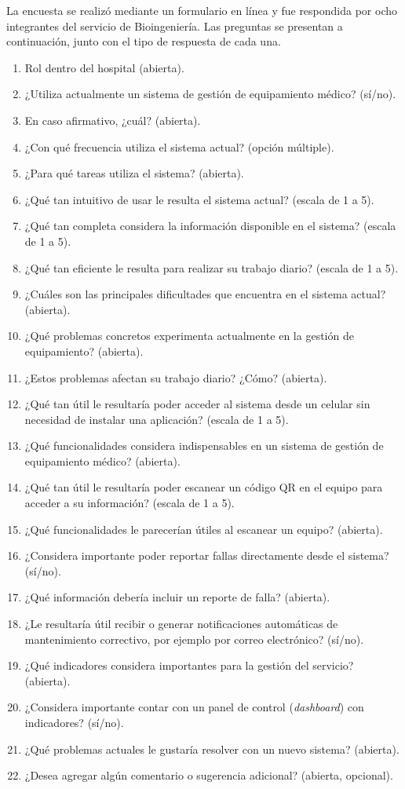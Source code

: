 \documentclass[10pt]{article}
\begin{document}
La encuesta se realizó mediante un formulario en línea y fue respondida por ocho integrantes del servicio de Bioingeniería. Las preguntas se presentan a continuación, junto con el tipo de respuesta de cada una.

{\small
\begin{enumerate}
    \item Rol dentro del hospital (abierta).
    \item ¿Utiliza actualmente un sistema de gestión de equipamiento médico? (sí/no).
    \item En caso afirmativo, ¿cuál? (abierta).
    \item ¿Con qué frecuencia utiliza el sistema actual? (opción múltiple).
    \item ¿Para qué tareas utiliza el sistema? (abierta).
    \item ¿Qué tan intuitivo de usar le resulta el sistema actual? (escala de 1 a 5).
    \item ¿Qué tan completa considera la información disponible en el sistema? (escala de 1 a 5).
    \item ¿Qué tan eficiente le resulta para realizar su trabajo diario? (escala de 1 a 5).
    \item ¿Cuáles son las principales dificultades que encuentra en el sistema actual? (abierta).
    \item ¿Qué problemas concretos experimenta actualmente en la gestión de equipamiento? (abierta).
    \item ¿Estos problemas afectan su trabajo diario? ¿Cómo? (abierta).
    \item ¿Qué tan útil le resultaría poder acceder al sistema desde un celular sin necesidad de instalar una aplicación? (escala de 1 a 5).
    \item ¿Qué funcionalidades considera indispensables en un sistema de gestión de equipamiento médico? (abierta).
    \item ¿Qué tan útil le resultaría poder escanear un código QR en el equipo para acceder a su información? (escala de 1 a 5).
    \item ¿Qué funcionalidades le parecerían útiles al escanear un equipo? (abierta).
    \item ¿Considera importante poder reportar fallas directamente desde el sistema? (sí/no).
    \item ¿Qué información debería incluir un reporte de falla? (abierta).
    \item ¿Le resultaría útil recibir o generar notificaciones automáticas de mantenimiento correctivo, por ejemplo por correo electrónico? (sí/no).
    \item ¿Qué indicadores considera importantes para la gestión del servicio? (abierta).
    \item ¿Considera importante contar con un panel de control (\textit{dashboard}) con indicadores? (sí/no).
    \item ¿Qué problemas actuales le gustaría resolver con un nuevo sistema? (abierta).
    \item ¿Desea agregar algún comentario o sugerencia adicional? (abierta, opcional).
\end{enumerate}
}
\end{document}
